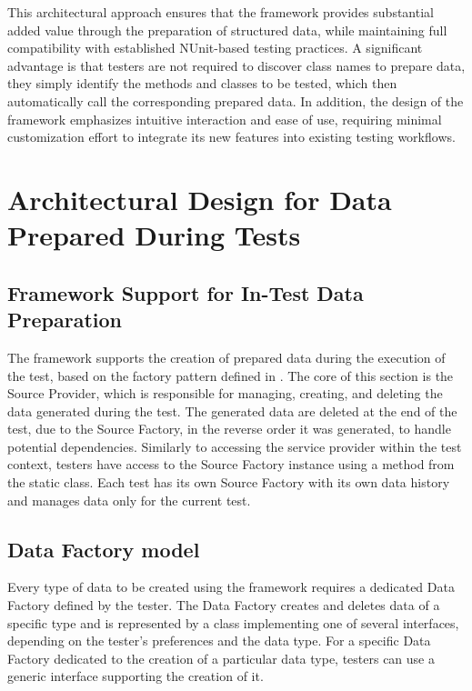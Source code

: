 This architectural approach ensures that the framework provides substantial added value through the preparation of structured data, while maintaining full compatibility with established NUnit-based testing practices. A significant advantage is that testers are not required to discover class names to prepare data, they simply identify the methods and classes to be tested, which then automatically call the corresponding prepared data. In addition, the design of the framework emphasizes intuitive interaction and ease of use, requiring minimal customization effort to integrate its new features into existing testing workflows.


\section{Architectural Design for Data Prepared During Tests} \label{sec:archDuring}

\subsection{Framework Support for In-Test Data Preparation}

The framework supports the creation of prepared data during the execution of the test, based on the factory pattern defined in . The core of this section is the Source Provider, which is responsible for managing, creating, and deleting the data generated during the test.  The generated data are deleted at the end of the test, due to the Source Factory, in the reverse order it was generated, to handle potential dependencies. Similarly to accessing the service provider within the test context, testers have access to the Source Factory instance using a method from the static class. Each test has its own Source Factory with its own data history and manages data only for the current test.

\subsection{Data Factory model}\label{subsec:dataFactoryModel}
Every type of data to be created using the framework requires a dedicated Data Factory defined by the tester. The Data Factory creates and deletes data of a specific type and is represented by a class implementing one of several interfaces, depending on the tester's preferences and the data type. For a specific Data Factory dedicated to the creation of a particular data type, testers can use a generic interface supporting the creation of it.

